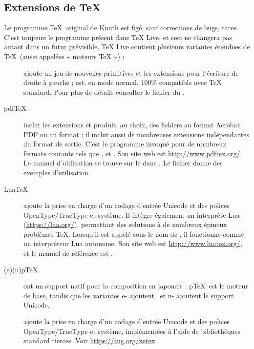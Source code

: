 \documentclass[german, english, french]{article}
\renewcommand{\TL}{\TeX{} Live\xspace}%
\begin{document}
\subsection{Extensions de \protect\TeX}
\label{sec:tex-extensions}

Le programme \TeX\ original de Knuth est figé, sauf corrections de bugs,
rares. C'est toujours le programme  présent dans \TL, et ceci ne
changera pas autant dans un futur prévisible. \TL contient plusieurs variantes
étendues de \TeX\ (aussi appelées « moteurs \TeX{} ») :

\begin{description}

\item [\eTeX{}] \label{text:etex} ajoute un jeu de nouvelles primitives et les
  extensions \TeXXeT{} pour l'écriture de droite à gauche ; \eTeX{} est, en mode
  normal, 100\% compatible avec \TeX{} standard.  Pour plus de détails consulter
  le fichier  du \DVD{}.

\item[pdf\TeX{}] inclut les extensions \eTeX{} et produit, au choix, des
  fichiers au format Acrobat PDF ou au format \dvi{} ; il inclut aussi de
  nombreuses extensions indépendantes du format de sortie. C'est le programme
  invoqué pour de nombreux formats courants tels que , 
  et . Son site web est \url{http://www.pdftex.org/}.  Le manuel
  d'utilisation se trouve sur le \DVD{} dans
  . Le fichier
   donne des exemples
  d'utilisation.

\item[Lua\TeX] ajoute la prise en charge d'un codage d'entrée Unicode et des
  polices OpenType/TrueType et système. Il intègre également un interprète Lua
  (\url{https://lua.org/}), permettant des solutions à de nombreux épineux
  problèmes \TeX{}. Lorsqu'il est appelé sous le nom de , il
  fonctionne comme un interpréteur Lua autonome. Son site web est
  \url{http://www.luatex.org/}, et le manuel de référence est
  .

\item[(e)(u)p\TeX] ont un support natif pour la composition en japonais ; p\TeX\
  est le moteur de base, tandis que les variantes e- ajoutent \eTeX\ et u-
  ajoutent le support Unicode.

\item[\XeTeX] ajoute la prise en charge d'un codage d'entrée Unicode et des
  polices OpenType/TrueType et système, implémentées à l'aide de bibliothèques
  standard tierces. Voir \url{https://tug.org/xetex}.


\end{description}
\end{document}
